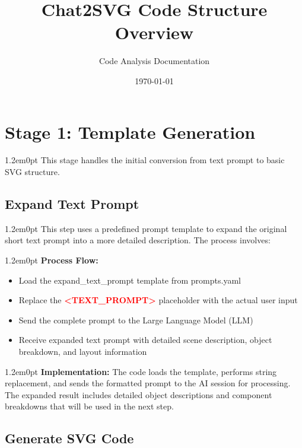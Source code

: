 \documentclass[10pt,a4paper]{article}
\newenvironment{bodytext}{\begin{adjustwidth}{1.2em}{0pt}}{\end{adjustwidth}}
\begin{document}
\title{Chat2SVG Code Structure Overview}
\author{Code Analysis Documentation}
\date{\today}
\maketitle

\section{Stage 1: Template Generation}

\begin{bodytext}
This stage handles the initial conversion from text prompt to basic SVG structure.
\end{bodytext}

\subsection{Expand Text Prompt}

\begin{bodytext}
This step uses a predefined prompt template to expand the original short text prompt into a more detailed description. The process involves:
\end{bodytext}

\begin{bodytext}
\textbf{Process Flow:}
\begin{itemize}
\item Load the expand\_text\_prompt template from prompts.yaml
\item Replace the \textcolor{red}{\textbf{<TEXT\_PROMPT>}} placeholder with the actual user input
\item Send the complete prompt to the Large Language Model (LLM)
\item Receive expanded text prompt with detailed scene description, object breakdown, and layout information
\end{itemize}
\end{bodytext}

\begin{bodytext}
\textbf{Implementation:} The code loads the template, performs string replacement, and sends the formatted prompt to the AI session for processing. The expanded result includes detailed object descriptions and component breakdowns that will be used in the next step.
\end{bodytext}

\subsection{Generate SVG Code}
\end{document}
